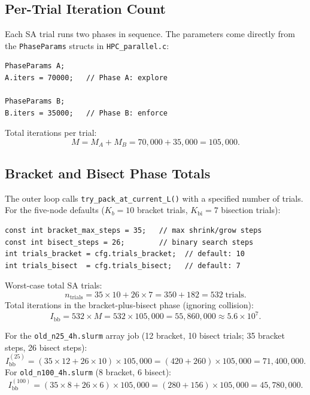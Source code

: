 \documentclass[11pt,oneside]{article}
\begin{document}
\subsection{Per-Trial Iteration Count}

Each SA trial runs two phases in sequence. The parameters come directly
from the \texttt{PhaseParams} structs in \texttt{HPC\_parallel.c}:

\begin{lstlisting}[style=cstyle,caption={Phase iteration counts.}]
PhaseParams A;
A.iters = 70000;   // Phase A: explore

PhaseParams B;
B.iters = 35000;   // Phase B: enforce
\end{lstlisting}

Total iterations per trial:
\begin{equation}
  M = M_A + M_B = 70{,}000 + 35{,}000 = 105{,}000.
  \label{eq:M}
\end{equation}

\subsection{Bracket and Bisect Phase Totals}

The outer loop calls \texttt{try\_pack\_at\_current\_L()} with a
specified number of trials. For the five-node defaults
($K_b = 10$ bracket trials, $K_{\mathrm{bi}} = 7$ bisection trials):

\begin{lstlisting}[style=cstyle,caption={Bracket and bisect parameters.}]
const int bracket_max_steps = 35;   // max shrink/grow steps
const int bisect_steps = 26;        // binary search steps
int trials_bracket = cfg.trials_bracket;  // default: 10
int trials_bisect  = cfg.trials_bisect;   // default: 7
\end{lstlisting}

Worst-case total SA trials:
\[
  n_{\mathrm{trials}} = 35 \times 10 + 26 \times 7
  = 350 + 182 = 532 \;\text{trials.}
\]
Total iterations in the bracket-plus-bisect phase (ignoring collision):
\begin{equation}
  I_{\mathrm{bb}} = 532 \times M = 532 \times 105{,}000
  = 55{,}860{,}000 \approx 5.6 \times 10^7.
  \label{eq:Ibb}
\end{equation}

For the \texttt{old\_n25\_4h.slurm} array job (12 bracket, 10 bisect
trials; 35 bracket steps, 26 bisect steps):
\[
  I_{\mathrm{bb}}^{(25)} = (35 \times 12 + 26 \times 10) \times 105{,}000
  = (420 + 260) \times 105{,}000 = 71{,}400{,}000.
\]
For \texttt{old\_n100\_4h.slurm} (8 bracket, 6 bisect):
\[
  I_{\mathrm{bb}}^{(100)} = (35 \times 8 + 26 \times 6) \times 105{,}000
  = (280 + 156) \times 105{,}000 = 45{,}780{,}000.
\]
\end{document}
